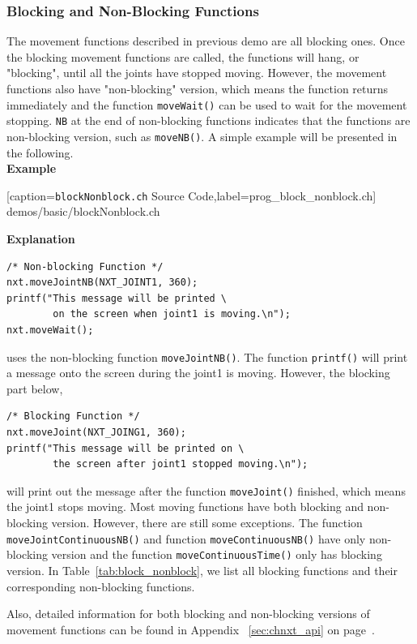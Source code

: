 \documentclass[11pt]{article}
\begin{document}
\subsubsection{\label{sec:block_nonblock}Blocking and Non-Blocking Functions}
The movement functions described in previous demo are all blocking ones. Once 
the blocking movement functions are called, the functions will hang, or 
"blocking", until all the joints have stopped moving. However, the movement 
functions also have "non-blocking" version, which means the function returns 
immediately and the function {\tt moveWait()} can be used to wait for the 
movement stopping. {\tt NB} at the end of non-blocking functions indicates 
that the functions are non-blocking version, such as {\tt moveNB()}. A simple 
example will be presented in the following.\\

\noindent
{\bf Example}

[caption={{\tt blockNonblock.ch} Source Code},label=prog_block_nonblock.ch]
{demos/basic/blockNonblock.ch}

\noindent
\textbf{Explanation}\\

\begin{lstlisting}
/* Non-blocking Function */
nxt.moveJointNB(NXT_JOINT1, 360);
printf("This message will be printed \
        on the screen when joint1 is moving.\n");
nxt.moveWait();
\end{lstlisting}
uses the non-blocking function {\tt moveJointNB()}. The function {\tt printf()} will
print a message onto the screen during the joint1 is moving. However, the blocking part below,
\begin{lstlisting}
/* Blocking Function */
nxt.moveJoint(NXT_JOING1, 360);
printf("This message will be printed on \
        the screen after joint1 stopped moving.\n");
\end{lstlisting}
will print out the message after the function {\tt moveJoint()} finished, which means the
joint1 stops moving. Most moving functions have both blocking and non-blocking version. However,
there are still some exceptions. The function {\tt moveJointContinuousNB()} and function
{\tt moveContinuousNB()} have only non-blocking version and the function {\tt moveContinuousTime()}
only has blocking version. In Table~\ref{tab:block_nonblock}, we list all blocking functions and their 
corresponding non-blocking functions.

Also, detailed information for both blocking and non-blocking versions of movement functions can be found in Appendix~
\ref{sec:chnxt_api} on page~\pageref{sec:chnxt_api}.
\end{document}
